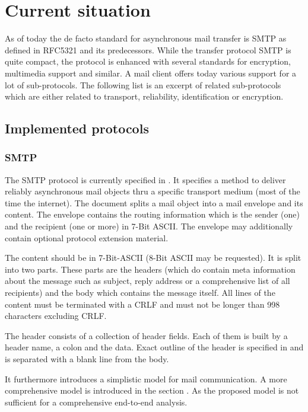\chapter{Current situation}
As of today the de facto standard for asynchronous mail transfer is SMTP as defined in RFC5321\cite{RFC5321} and its predecessors. While the transfer protocol SMTP is quite compact, the protocol is enhanced with several standards for encryption, multimedia support and similar. A mail client offers today various support for a lot of sub-protocols. The following list is an excerpt of related sub-protocols which are either related to transport, reliability, identification or encryption. 

\section{Implemented protocols}
\subsection{SMTP }
The SMTP protocol is currently specified in \cite{RFC5321}. It specifies a method to deliver reliably asynchronous mail objects thru a specific transport medium (most of the time the internet). The document splits a mail object into a mail envelope and its content. The envelope contains the routing information which is the sender (one) and the recipient (one or more) in 7-Bit ASCII. The envelope may additionally contain optional protocol extension material. \par

The content should be in 7-Bit-ASCII (8-Bit ASCII may be requested). It is split into two parts. These parts are the headers (which do contain meta information about the message such as subject, reply address or a comprehensive list of all recipients) and the body which contains the message itself. All lines of the content must be terminated with a CRLF and must not be longer than 998 characters excluding CRLF.\par

The header consists of a collection of header fields. Each of them is built by a header name, a colon and the data. Exact outline of the header is specified in \cite{RFC5322} and is separated with a blank line from the body. 

It \cite{RFC5321} furthermore introduces a simplistic model for mail communication. A more comprehensive model is introduced in the section . As the proposed model is not sufficient for a comprehensive end-to-end analysis.\par

